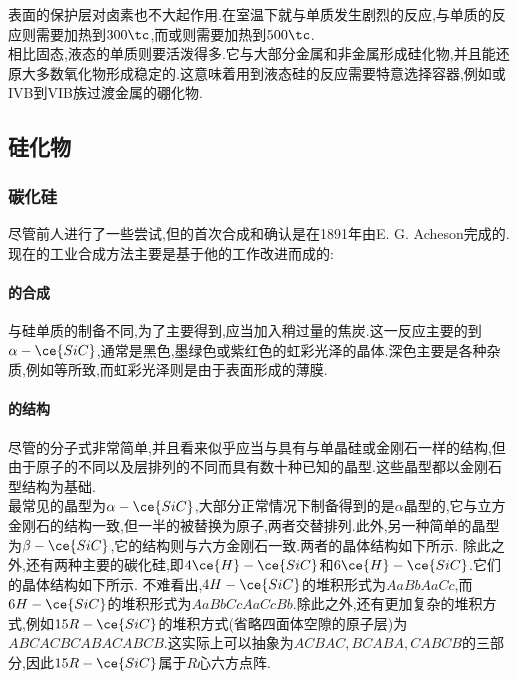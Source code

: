 \documentclass{ctexart}
\begin{document}
\indent {}表面的保护层对卤素也不大起作用.在室温下就与单质发生剧烈的反应,与单质的反应则需要加热到$300\tc$,而或则需要加热到$500\tc$.\\
\indent 相比固态,液态的单质则要活泼得多.它与大部分金属和非金属形成硅化物,并且能还原大多数氧化物形成稳定的.这意味着用到液态硅的反应需要特意选择容器,例如或IVB到VIB族过渡金属的硼化物.
\subsection{硅化物}
\subsubsection{碳化硅}
尽管前人进行了一些尝试,但的首次合成和确认是在1891年由E. G. Acheson完成的.现在的工业合成方法主要是基于他的工作改进而成的:
\begin{center}
\end{center}
\paragraph{的合成}
与硅单质的制备不同,为了主要得到,应当加入稍过量的焦炭.这一反应主要的到$\alpha-\ce{SiC}$,通常是黑色,墨绿色或紫红色的虹彩光泽的晶体.深色主要是各种杂质,例如等所致,而虹彩光泽则是由于表面形成的薄膜.
\paragraph{的结构}
尽管的分子式非常简单,并且看来似乎应当与具有与单晶硅或金刚石一样的结构,但由于原子的不同以及层排列的不同而具有数十种已知的晶型.这些晶型都以金刚石型结构为基础.\\
\indent 最常见的晶型为$\alpha-\ce{SiC}$,大部分正常情况下制备得到的是$\alpha$晶型的,它与立方金刚石的结构一致,但一半的被替换为原子,两者交替排列.此外,另一种简单的晶型为$\beta-\ce{SiC}$,它的结构则与六方金刚石一致.两者的晶体结构如下所示.
除此之外,还有两种主要的碳化硅,即$4\ce{H}-\ce{SiC}$和$6\ce{H}-\ce{SiC}$.它们的晶体结构如下所示.
不难看出,$4H-\ce{SiC}$的堆积形式为$AaBbAaCc$,而$6H-\ce{SiC}$的堆积形式为$AaBbCcAaCcBb$.除此之外,还有更加复杂的堆积方式,例如$15R-\ce{SiC}$的堆积方式(省略四面体空隙的原子层)为$ABCACBCABACABCB$.这实际上可以抽象为$ACBAC,BCABA,CABCB$的三部分,因此$15R-\ce{SiC}$属于$R$心六方点阵.
\end{document}
